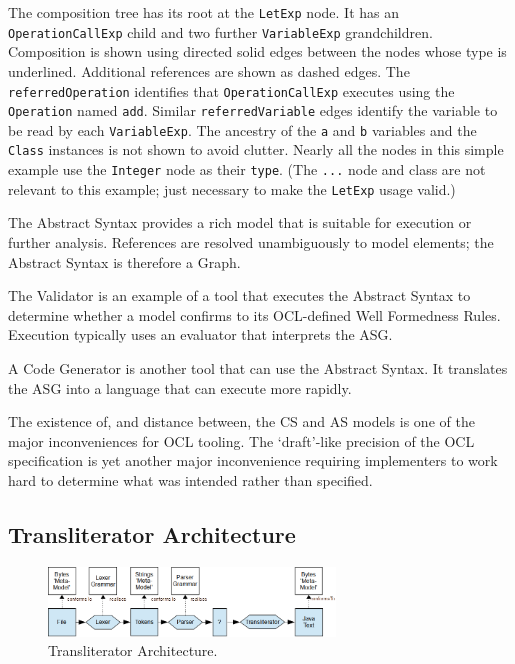 \documentclass[sigconf]{acmart}
\begin{document}
The composition tree has its root at the \verb|LetExp| node. It has an \verb|OperationCallExp| child and two further \verb|VariableExp| grandchildren. Composition is shown using directed solid edges between the nodes whose type is underlined. Additional references are shown as dashed edges. The \verb|referredOperation| identifies that \verb|OperationCallExp| executes using the \verb|Operation| named \verb|add|. Similar \verb|referredVariable| edges identify the variable to be read by each \verb|VariableExp|. The ancestry of the \verb|a| and \verb|b| variables and the \verb|Class| instances is not shown to avoid clutter. Nearly all the nodes in this simple example use the \verb|Integer| node as their \verb|type|. (The \verb|...| node and class are not relevant to this example; just necessary to make the \verb|LetExp| usage valid.)

The Abstract Syntax provides a rich model that is suitable for execution or further analysis. References are resolved unambiguously to model elements; the Abstract Syntax is therefore a Graph. 

The Validator is an example of a tool that executes the Abstract Syntax to determine whether a model confirms to its OCL-defined Well Formedness Rules. Execution typically uses an evaluator that interprets the ASG.

A Code Generator is another tool that can use the Abstract Syntax. It translates the ASG into a language that can execute more rapidly.

The existence of, and distance between, the CS and AS models is one of the major inconveniences for OCL tooling. The `draft'-like precision \cite{Willink2020} of the OCL specification is yet another major inconvenience requiring implementers to work hard to determine what was intended rather than specified.

\subsection{Transliterator Architecture}

\begin{figure}
	\includegraphics[width=3.0in]{Transliterator.png}
	\caption{Transliterator Architecture.}
	\label{fig:transliterator}
\end{figure}
\end{document}
